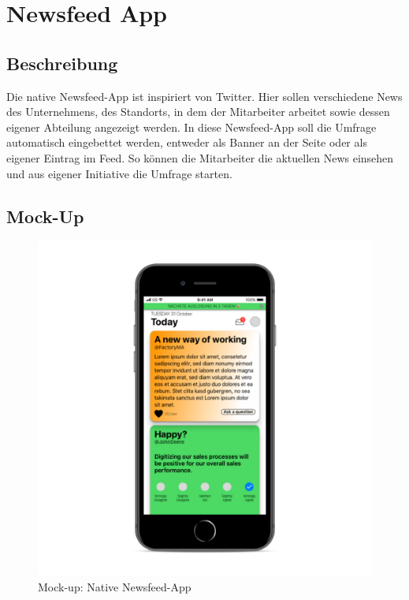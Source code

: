 \section{Newsfeed App}
\label{section:newsfeed_app}

\subsection{Beschreibung}

Die native Newsfeed-App ist inspiriert von Twitter. Hier sollen verschiedene News des Unternehmens, des Standorts, in dem der Mitarbeiter arbeitet sowie dessen eigener Abteilung angezeigt werden. In diese Newsfeed-App soll die Umfrage automatisch eingebettet werden, entweder als Banner an der Seite oder als eigener Eintrag im Feed. So können die Mitarbeiter die aktuellen News einsehen und aus eigener Initiative die Umfrage starten.

\subsection{Mock-Up}

\begin{figure}[H] 
\centering 
\includegraphics[scale=0.72]{images/5mockup} 
\caption[Mock-up: Native Newsfeed-App]{Mock-up: Native Newsfeed-App\protect} 
\label{ws} 
\end{figure}

